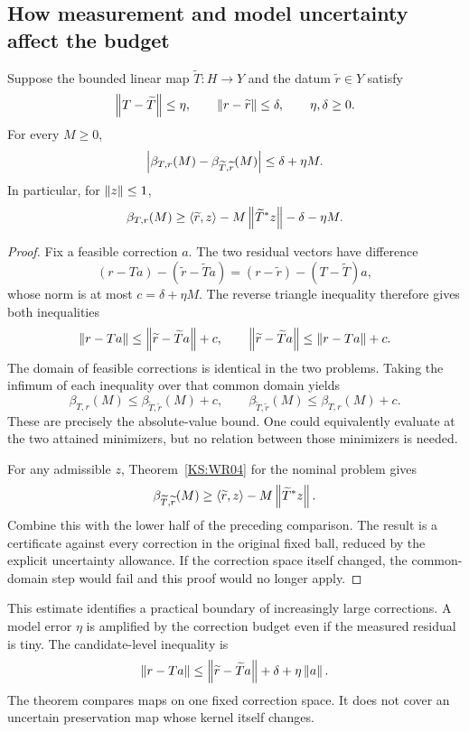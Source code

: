 \subsection{How measurement and model uncertainty affect the budget}
\begin{KStheorem}\label{KS:WR05}
Suppose the bounded linear map $\widetilde T:H\to Y$ and the datum $\widetilde r\in Y$ satisfy
\[
 \left\lVert T-\widetilde T\right\rVert\le\eta,\qquad
 \left\lVert r-\widetilde r\right\rVert\le\delta,\qquad\eta,\delta\ge0.
\]
For every $M\ge0$,
\[
 \left\lvert\beta_{T,r}(M)-\beta_{\widetilde T,\widetilde r}(M)\right\rvert
 \le\delta+\eta M.
\]
In particular, for $\left\lVert z\right\rVert\le1$,
\[
 \beta_{T,r}(M)\ge
 \langle\widetilde r,z\rangle-M\left\lVert\widetilde T^*z\right\rVert
       -\delta-\eta M.
\]
\end{KStheorem}
\begin{proof}
Fix a feasible correction $a$. The two residual vectors have difference
\[
 (r-Ta)-(\widetilde r-\widetilde Ta)
 =(r-\widetilde r)-(T-\widetilde T)a,
\]
whose norm is at most $c=\delta+\eta M$. The reverse triangle inequality therefore gives both inequalities
\[
 \left\lVert r-Ta\right\rVert\le\left\lVert\widetilde r-\widetilde Ta\right\rVert+c,
 \qquad
 \left\lVert\widetilde r-\widetilde Ta\right\rVert\le\left\lVert r-Ta\right\rVert+c.
\]
The domain of feasible corrections is identical in the two problems. Taking the infimum of each inequality over that common domain yields
\[
 \beta_{T,r}(M)\le\beta_{\widetilde T,\widetilde r}(M)+c,
 \qquad
 \beta_{\widetilde T,\widetilde r}(M)\le\beta_{T,r}(M)+c.
\]
These are precisely the absolute-value bound. One could equivalently evaluate at the two attained minimizers, but no relation between those minimizers is needed.

For any admissible $z$, Theorem~\ref{KS:WR04} for the nominal problem gives
\[
 \beta_{\widetilde T,\widetilde r}(M)
 \ge\langle\widetilde r,z\rangle-M\left\lVert\widetilde T^*z\right\rVert.
\]
Combine this with the lower half of the preceding comparison. The result is a certificate against every correction in the original fixed ball, reduced by the explicit uncertainty allowance. If the correction space itself changed, the common-domain step would fail and this proof would no longer apply.
\end{proof}

This estimate identifies a practical boundary of increasingly large corrections. A model error $\eta$ is amplified by the correction budget even if the measured residual is tiny. The candidate-level inequality is
\[
 \left\lVert r-Ta\right\rVert\le\left\lVert\widetilde r-\widetilde Ta\right\rVert+\delta+\eta\left\lVert a\right\rVert.
\]
The theorem compares maps on one fixed correction space. It does not cover an uncertain preservation map whose kernel itself changes.

